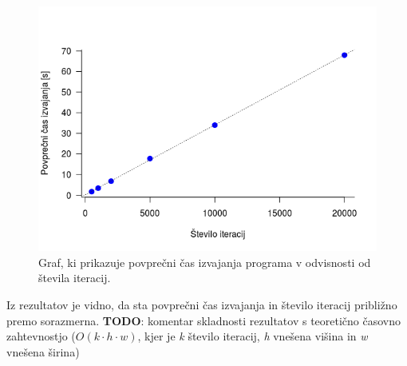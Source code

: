 \documentclass[a4paper,11pt]{article}
\begin{document}
\begin{figure}[H]
\begin{center}
\includegraphics[scale=0.8]{rezultati_porocilo1.png}
\end{center}
\caption{Graf, ki prikazuje povprečni čas izvajanja programa v odvisnosti od števila iteracij.}
\label{graf-rezultati-sekvencni}
\end{figure}

Iz rezultatov je vidno, da sta povprečni čas izvajanja in število iteracij približno premo sorazmerna.
\textbf{TODO}: komentar skladnosti rezultatov s teoretično časovno zahtevnostjo ($O(k\cdot h\cdot w)$, kjer je \textit{k} število iteracij, \textit{h} vnešena višina in \textit{w} vnešena širina)
\end{document}
